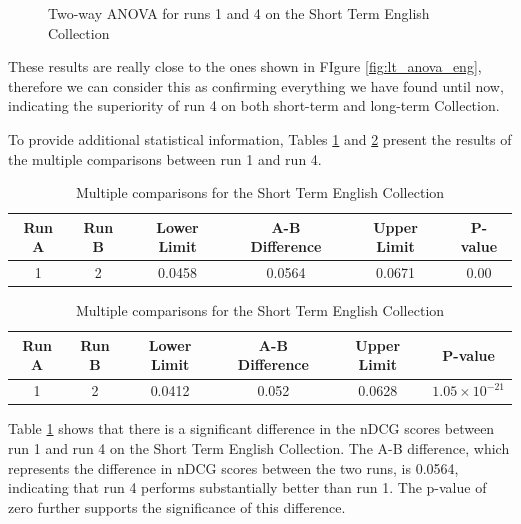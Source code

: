 \begin{figure}[!h]
\begin{subfigure}[b]{0.49\textwidth}
        \label{fig:st_anova_eng_ap}
    \end{subfigure}
    \caption{Two-way ANOVA for runs 1 and 4 on the Short Term English Collection}
    \label{fig:st_anova_eng}
\end{figure}

These results are really close to the ones shown in FIgure \ref{fig:lt_anova_eng}, therefore we can consider this as confirming everything we have found until now, indicating the superiority of run 4 on both short-term and long-term Collection.

To provide additional statistical information, Tables \ref{table:st_anova_eng} and \ref{table:st_anova_eng_ap} present the results of the multiple comparisons between run 1 and run 4.

\begin{table}[!h]
    \centering
    \caption{Multiple comparisons for the Short Term English Collection}
    \label{table:st_anova_eng}
    \begin{tabular}{cccccc}
    \hline
    Run A & Run B & Lower Limit & A-B Difference & Upper Limit & P-value \\
    \hline
    1 & 2 & 0.0458 & 0.0564 & 0.0671 & 0.00 \\
    \hline
    \end{tabular}
\end{table}

\begin{table}[!h]
    \centering
    \caption{Multiple comparisons for the Short Term English Collection}
    \label{table:st_anova_eng_ap}
    \begin{tabular}{cccccc}
    \hline
    Run A & Run B & Lower Limit & A-B Difference & Upper Limit & P-value \\
    \hline
    1 & 2 & 0.0412 & 0.052 & 0.0628 & $1.05 \times 10^{-21}$ \\
    \hline
    \end{tabular}
\end{table}

Table \ref{table:st_anova_eng} shows that there is a significant difference in the \ac{nDCG} scores between run 1 and run 4 on the Short Term English Collection. 
The A-B difference, which represents the difference in \ac{nDCG} scores between the two runs, is 0.0564, indicating that run 4 performs substantially better than run 1. 
The p-value of zero further supports the significance of this difference.

